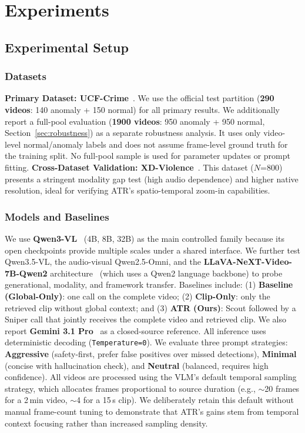 \section{Experiments}
\label{sec:experiments}

\subsection{Experimental Setup}
\label{sec:setup}

\subsubsection{Datasets}

\textbf{Primary Dataset: UCF-Crime}~\cite{sultani2018real}. We use the official test partition (\textbf{290 videos}: 140 anomaly + 150 normal) for all primary results. We additionally report a full-pool evaluation (\textbf{1900 videos}: 950 anomaly + 950 normal, Section~\ref{sec:robustness}) as a separate robustness analysis. It uses only video-level normal/anomaly labels and does not assume frame-level ground truth for the training split. No full-pool sample is used for parameter updates or prompt fitting.
\textbf{Cross-Dataset Validation: XD-Violence}~\cite{wu2020not}. This dataset ($N$=800) presents a stringent modality gap test (high audio dependence) and higher native resolution, ideal for verifying ATR's spatio-temporal zoom-in capabilities.

\subsubsection{Models and Baselines}

We use \textbf{Qwen3-VL}~\cite{bai2025qwenvl} (4B, 8B, 32B) as the main controlled family because its open checkpoints provide multiple scales under a shared interface. We further test Qwen3.5-VL, the audio-visual Qwen2.5-Omni, and the \textbf{LLaVA-NeXT-Video-7B-Qwen2} architecture~\cite{li2024llavanext} (which uses a Qwen2 language backbone) to probe generational, modality, and framework transfer. Baselines include: (1) \textbf{Baseline (Global-Only)}: one call on the complete video; (2) \textbf{Clip-Only}: only the retrieved clip without global context; and (3) \textbf{ATR (Ours)}: Scout followed by a Sniper call that jointly receives the complete video and retrieved clip. We also report \textbf{Gemini 3.1 Pro}~\cite{team2023gemini} as a closed-source reference.
All inference uses deterministic decoding (\texttt{Temperature=0}). We evaluate three prompt strategies: \textbf{Aggressive} (safety-first, prefer false positives over missed detections), \textbf{Minimal} (concise with hallucination check), and \textbf{Neutral} (balanced, requires high confidence).
All videos are processed using the VLM's default temporal sampling strategy, which allocates frames proportional to source duration (e.g., $\sim$20 frames for a 2\,min video, $\sim$4 for a 15\,s clip). We deliberately retain this default without manual frame-count tuning to demonstrate that ATR's gains stem from temporal context focusing rather than increased sampling density.


